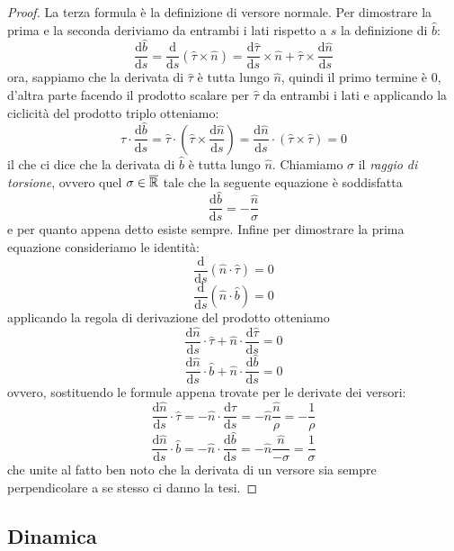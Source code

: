 \documentclass[11pt]{scrartcl}
\newcommand{\dif}{\text{d}}
\begin{document}
	\begin{proof}
		La terza formula è la definizione di versore normale. Per dimostrare la prima e la seconda deriviamo da entrambi i lati rispetto a $s$ la definizione di $\hat{b}$:
		$$\frac{\dif \hat{b}}{\dif s}=\frac{\dif}{\dif s}\left(\hat{\tau}\times \hat{n}\right)=\frac{\dif\hat{\tau}}{\dif s}\times \hat{n}+\hat{\tau}\times \frac{\dif \hat{n}}{\dif s}$$
		ora, sappiamo che la derivata di $\hat{\tau}$ è tutta lungo $\hat{n}$, quindi il primo termine è $0$, d'altra parte facendo il prodotto scalare per $\hat{\tau}$ da entrambi i lati e applicando la ciclicità del prodotto triplo otteniamo:
		$$\hat{\tau}\cdot\frac{\dif \hat{b}}{\dif s}=\hat{\tau}\cdot\left(\hat{\tau}\times \frac{\dif \hat{n}}{\dif s}\right)=\frac{\dif \hat{n}}{\dif s}\cdot\left(\hat{\tau}\times \hat{\tau}\right)=0$$
		il che ci dice che la derivata di $\hat{b}$ è tutta lungo $\hat{n}$. Chiamiamo $\sigma$ il \textit{raggio di torsione}, ovvero quel $\sigma\in \overline{\mathbb R}$ tale che la seguente equazione è soddisfatta
		$$\frac{\dif \hat{b}}{\dif s}=-\frac{\hat{n}}{\sigma}$$
		e per quanto appena detto esiste sempre. Infine per dimostrare la prima equazione consideriamo le identità:
		$$\frac{\dif}{\dif s}\left(\hat{n}\cdot \hat{\tau}\right)=0$$
		$$\frac{\dif}{\dif s}\left(\hat{n}\cdot \hat{b}\right)=0$$
		applicando la regola di derivazione del prodotto otteniamo
		$$\frac{\dif \hat{n}}{\dif s}\cdot \hat{\tau}+\hat{n}\cdot\frac{\dif \hat{\tau}}{\dif s}=0$$
		$$\frac{\dif \hat{n}}{\dif s}\cdot \hat{b}+\hat{n}\cdot\frac{\dif \hat{b}}{\dif s}=0$$
		ovvero, sostituendo le formule appena trovate per le derivate dei versori:
		$$\frac{\dif \hat{n}}{\dif s}\cdot \hat{\tau}=-\hat{n}\cdot\frac{\dif \hat{\tau}}{\dif s}=-\hat{n}\frac{\hat{n}}{\rho}=-\frac{1}{\rho}$$
		$$\frac{\dif \hat{n}}{\dif s}\cdot \hat{b}=-\hat{n}\cdot\frac{\dif \hat{b}}{\dif s}=-\hat{n}\frac{\hat{n}}{-\sigma}=\frac{1}{\sigma}$$
		che unite al fatto ben noto che la derivata di un versore sia sempre perpendicolare a se stesso ci danno la tesi.
	\end{proof}
	
	\newpage
	
	\subsection{Dinamica}
	
\end{document}
